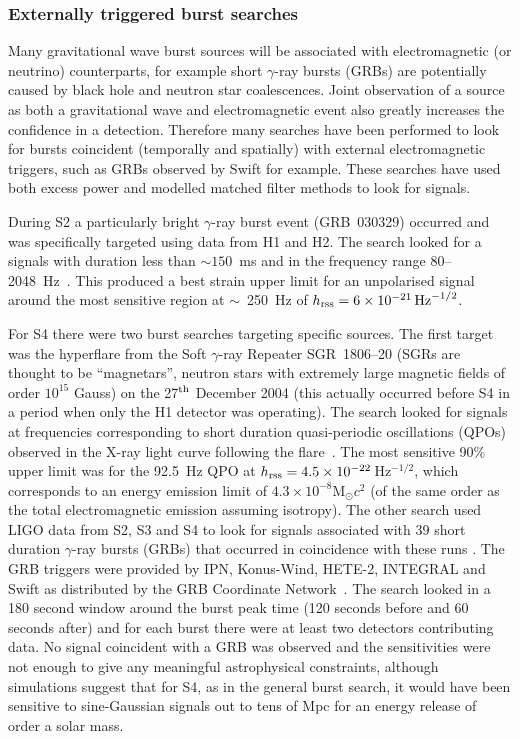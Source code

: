 \documentclass{article}
\begin{document}
\subsubsection{Externally triggered burst searches}

Many gravitational wave burst sources will be associated with electromagnetic
(or neutrino) counterparts, for example short $\gamma$-ray bursts (GRBs) are
potentially caused by black hole and neutron star coalescences. Joint
observation of a source as both a gravitational wave and electromagnetic
event also greatly increases the confidence in a detection. Therefore many
searches have been performed to look for bursts coincident (temporally and
spatially) with external electromagnetic triggers, such as GRBs observed by
Swift for example. These searches have used both excess power and modelled
matched filter methods to look for signals.

During S2 a particularly bright $\gamma$-ray burst event (GRB~030329) occurred
and was specifically targeted using data from H1 and H2. The search looked for
a signals with duration less than $\sim 150$~ms and in the frequency range
80--2048~Hz~\cite{Abbott:2005d}. This produced a best strain upper limit for an
unpolarised signal around the most sensitive region at  $\sim$~250~Hz of $h_{\rm
rss}=6\times10^{-21}\,{\rm Hz}^{-1/2}$.

For S4 there were two burst searches targeting specific sources. The first
target was the hyperflare from the Soft $\gamma$-ray Repeater SGR~1806--20
(SGRs are thought to be ``magnetars'', neutron stars with extremely large
magnetic fields of order $10^{15}$ Gauss) on the 27$^{\rm th}$ December 2004
\cite{Hurley:2005} (this actually occurred before S4 in a period when only the
H1 detector was operating). The search looked for signals at frequencies
corresponding to short duration quasi-periodic oscillations (QPOs) observed in
the X-ray light curve following the flare~\cite{Abbott:2007c}. The most
sensitive 90\% upper limit was for the 92.5~Hz QPO at $h_{\rm rss} =
4.5\times10^{-22}$\,Hz$^{-1/2}$, which corresponds to an energy emission limit
of $4.3\times10^{-8}$M$_{\odot}c^2$ (of the same order as the total
electromagnetic emission assuming isotropy). The other search used LIGO data
from S2, S3 and S4 to look for signals associated with 39 short duration
$\gamma$-ray bursts (GRBs) that occurred in coincidence with these runs
\cite{Abbott:2008c}. The GRB triggers were provided by IPN, Konus-Wind, HETE-2,
INTEGRAL and Swift as distributed by the GRB Coordinate Network~\cite{GCN}. The
search looked in a 180 second window around the burst peak time (120 seconds
before and 60 seconds after) and for each burst there were at least two
detectors contributing data. No signal coincident with a GRB was observed and
the sensitivities were not enough to give any meaningful astrophysical
constraints, although simulations suggest that for S4, as in the general burst
search, it would have been sensitive to sine-Gaussian signals out to tens of Mpc
for an energy release of order a solar mass.
\end{document}
